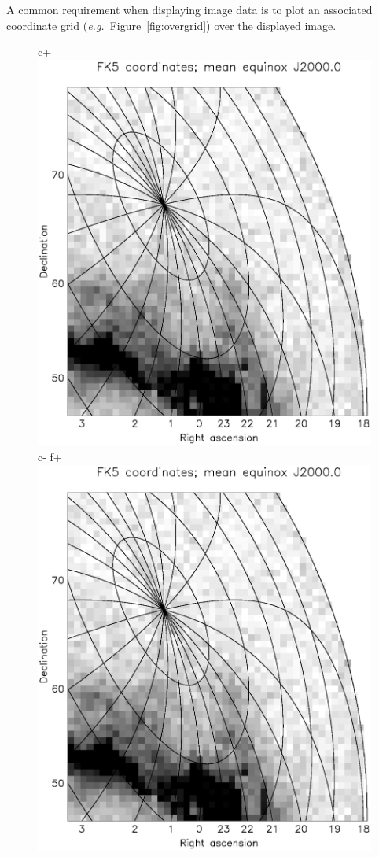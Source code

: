 \documentclass[twoside,11pt]{article}
\newenvironment{latexonly}{}{}
\begin{document}
\begin{latexonly}
   A common requirement when displaying image data is to plot an
   associated coordinate grid ({\em{e.g.}}\ Figure~\ref{fig:overgrid})
   over the displayed image.
   \begin{figure}
   \begin{center}
c+
   \includegraphics[scale=0.7]{sun211_figures/overgrid_bw.eps}
c-
f+
   \includegraphics[scale=0.7]{sun210_figures/overgrid_bw.eps}

\end{center}
\end{figure}
\end{latexonly}
\end{document}
